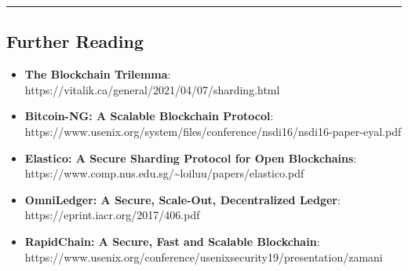 \begin{center}\rule{0.5\linewidth}{0.5pt}\end{center}

\subsection{Further Reading}\label{further-reading}

\begin{itemize}
\tightlist
\item
  \textbf{The Blockchain Trilemma}:
  https://vitalik.ca/general/2021/04/07/sharding.html
\item
  \textbf{Bitcoin-NG: A Scalable Blockchain Protocol}:
  https://www.usenix.org/system/files/conference/nsdi16/nsdi16-paper-eyal.pdf
\item
  \textbf{Elastico: A Secure Sharding Protocol for Open Blockchains}:
  https://www.comp.nus.edu.sg/\textasciitilde loiluu/papers/elastico.pdf
\item
  \textbf{OmniLedger: A Secure, Scale-Out, Decentralized Ledger}:
  https://eprint.iacr.org/2017/406.pdf
\item
  \textbf{RapidChain: A Secure, Fast and Scalable Blockchain}:
  https://www.usenix.org/conference/usenixsecurity19/presentation/zamani
\end{itemize}